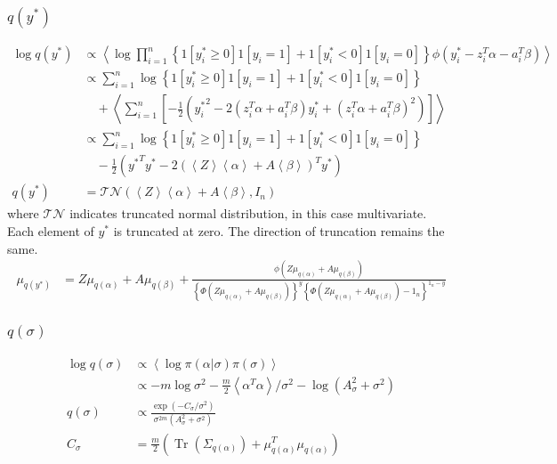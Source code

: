 \documentclass[11pt]{article}
\DeclareMathOperator{\Tr}{Tr}
\begin{document}
\subsubsection{$q\left(y^{*}\right)$}
\begin{align*}
  \log q\left(y^{*}\right) &\propto \left\langle \log \prod_{i=1}^{n}\left\{1\left[y_{i}^{*}\ge 0\right]1\left[y_{i}=1\right] + 1\left[y_{i}^{*}<0\right]1\left[y_{i}=0\right] \right\}\phi\left(y_{i}^{*}-z_{i}^{T}\alpha -a_{i}^{T}\beta\right) \right\rangle \\
  &\propto \sum_{i=1}^{n}\log\left\{1\left[y_{i}^{*}\ge 0\right]1\left[y_{i}=1\right] + 1\left[y_{i}^{*}<0\right]1\left[y_{i}=0\right] \right\} \\
  &\quad + \left\langle\sum_{i=1}^{n}\left[-\frac{1}{2}\left({y_{i}^{*}}^{2} -2\left(z_{i}^{T}\alpha +a_{i}^{T}\beta\right)y_{i}^{*} +\left(z_{i}^{T}\alpha +a_{i}^{T}\beta\right)^{2}\right) \right] \right\rangle\\
  &\propto \sum_{i=1}^{n}\log\left\{1\left[y_{i}^{*}\ge 0\right]1\left[y_{i}=1\right] + 1\left[y_{i}^{*}<0\right]1\left[y_{i}=0\right] \right\} \\
  &\quad -\frac{1}{2}\left({y^{*}}^{T}y^{*} -2\left(\left\langle Z\right\rangle \left\langle \alpha\right\rangle +A\left\langle\beta\right\rangle \right)^{T}y^{*}\right)\\
  q\left(y^{*}\right) &= \mathcal{TN}\left(\left\langle Z\right\rangle \left\langle \alpha\right\rangle +A\left\langle\beta\right\rangle, I_{n}\right)
\end{align*}
where $\mathcal{TN}$ indicates truncated normal distribution, in this case multivariate. Each element of $y^{*}$ is truncated at zero. The direction of truncation remains the same.
\begin{align*}
  \mu_{q\left(y^{*}\right)} &= Z\mu_{q\left(\alpha\right)} +A\mu_{q\left(\beta\right)} +\frac{\phi\left(Z\mu_{q\left(\alpha\right)}+A\mu_{q\left(\beta\right)}\right)}{\left\{\Phi\left(Z\mu_{q\left(\alpha\right)}+A\mu_{q\left(\beta\right)}\right) \right\}^{y}\left\{\Phi\left(Z\mu_{q\left(\alpha\right)}+A\mu_{q\left(\beta\right)}\right)-1_{n} \right\}^{1_{n}-y}}
\end{align*}
\subsubsection{$q\left(\sigma\right)$}
\begin{align*}
  \log q\left(\sigma\right) &\propto \left\langle \log \pi\left(\alpha|\sigma\right)\pi\left(\sigma\right) \right\rangle\\
  &\propto -m\log \sigma^{2} -\frac{m}{2}\left\langle \alpha^{T}\alpha \right\rangle /\sigma^{2} -\log \left(A_{\sigma}^{2} +\sigma^{2}\right)\\
  q\left(\sigma\right) &\propto \frac{\exp \left(-C_{\sigma}/\sigma^{2}\right)}{\sigma^{2m}\left(A_{\sigma}^{2}+\sigma^{2}\right)}\\
  C_{\sigma} &= \frac{m}{2}\left(\Tr\left(\Sigma_{q\left(\alpha\right)}\right) + \mu_{q\left(\alpha\right)}^{T}\mu_{q\left(\alpha\right)}\right)
\end{align*}
\end{document}
